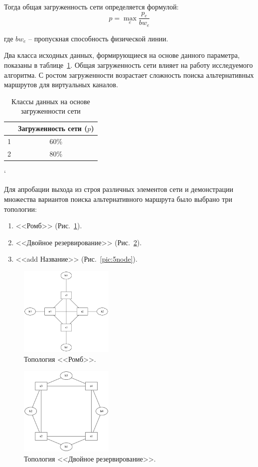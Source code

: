 \documentclass[12pt, a4paper]{article}
\begin{document}
Тогда общая загруженность сети определяется формулой:
$$p = \max_{e}\frac{p_{e}}{bw_{e}}$$

где $bw_{e}$ -- пропускная способность физической линии.

Два класса исходных данных, формирующиеся на основе данного параметра, показаны в таблице~\ref{table:loadclass}. Общая загруженность сети влияет на работу исследуемого алгоритма. С ростом загруженности возрастает сложность поиска альтернативных маршрутов для виртуальных каналов. 

\begin{table}[h]
\begin{center}
\begin{tabular}{|c|c|}
\hline
	& Загруженность сети ($p$)\\
\hline
	1 & 60\% \\
\hline
	2 & 80\% \\
\hline
\end{tabular}
\end{center}
\caption{Классы данных на основе загруженности сети}
\label{table:loadclass}`
\end{table}

Для апробации выхода из строя различных элементов сети и демонстрации множества вариантов поиска альтернативного маршрута было выбрано три топологии:
\begin{enumerate}
	\item <<Ромб>> (Рис.~\ref{pic:4node}).
	\item <<Двойное резервирование>> (Рис.~\ref{pic:double}).
	\item <<add Название>> (Рис.~\ref{pic:5node}).
\end{enumerate}

\begin{figure}[h!]
	\centering
	\includegraphics[width=0.40\textwidth]{img/4node.png}
	\caption{Топология <<Ромб>>.}
	\label{pic:4node}
\end{figure}

\begin{figure}[h!]
	\centering
	\includegraphics[width=0.40\textwidth]{img/double.png}
	\caption[russian]{Топология <<Двойное резервирование>>.}
	\label{pic:double}
\end{figure}
\end{document}
